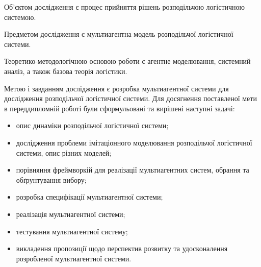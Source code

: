 Об'єктом дослідження є процес прийняття рішень розподільчою логістичною системою. 

Предметом дослідження є мультиагентна модель розподільчої логістичної системи. 

Теоретико-методологічною основою роботи є агентне моделювання, системний аналіз, а також базова теорія логістики.

Метою і завданням дослідження є розробка мультиагентної системи для дослідження розподільчої логістичної системи.
Для досягнення поставленої мети в переддипломній роботі були сформульовані та вирішені наступні задачі:
\begin{itemize}
	\item опис динаміки розподільчої логістичної системи;
	\item дослідження проблеми імітаціонного моделювання розподільчої логістичної системи, опис різних моделей;
	\item порівняння фреймворкій для реалізації мультиагентних систем, обрання та обґрунтування вибору;
	\item розробка специфікації мультиагентної системи;
	\item реалізація мультиагентної системи;
	\item тестування мультиагентної систему;
	\item викладення пропозиції щодо перспектив розвитку та удосконалення розробленої мультиагентної системи.
\end{itemize}






